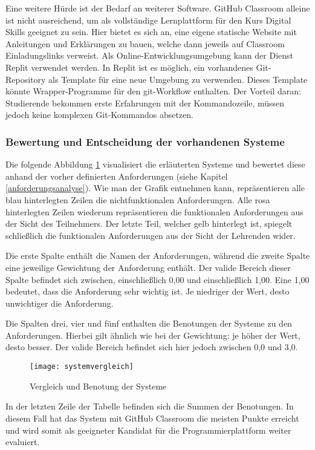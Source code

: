 Eine weitere Hürde ist der Bedarf an weiterer Software. GitHub Classroom alleine
ist nicht ausreichend, um als vollständige Lernplattform für den Kurs Digital
Skills geeignet zu sein. Hier bietet es sich an, eine eigene statische Website
mit Anleitungen und Erklärungen zu bauen, welche dann jeweils auf Classroom
Einladungslinks verweist. Als Online-Entwicklungsumgebung kann der Dienst Replit
verwendet werden. In Replit ist es möglich, ein vorhandenes Git-Repository als
Template für eine neue Umgebung zu verwenden. Dieses Template könnte
Wrapper-Programme für den git-Workflow enthalten. Der Vorteil daran:
Studierende bekommen erste Erfahrungen mit der Kommandozeile, müssen jedoch
keine komplexen Git-Kommandos absetzen.

\subsubsection{Bewertung und Entscheidung der vorhandenen Systeme}
Die folgende Abbildung \ref{fig:systemvergleich} visualisiert die erläuterten
Systeme und bewertet diese anhand der vorher definierten Anforderungen (siehe 
Kapitel \ref{anforderungsanalyse}). Wie man der Grafik entnehmen kann,
repräsentieren alle blau hinterlegten Zeilen die nichtfunktionalen
Anforderungen. Alle rosa hinterlegten Zeilen wiederum repräsentieren die
funktionalen Anforderungen aus der Sicht des Teilnehmers. Der letzte Teil,
welcher gelb hinterlegt ist, spiegelt schließlich die funktionalen Anforderungen
aus der Sicht der Lehrenden wider.

Die erste Spalte enthält die Namen der Anforderungen, während die zweite Spalte
eine jeweilige Gewichtung der Anforderung enthält. Der valide Bereich dieser
Spalte befindet sich zwischen, einschließlich 0,00 und einschließlich 1,00. Eine
1,00 bedeutet, dass die Anforderung sehr wichtig ist. Je niedriger der Wert,
desto unwichtiger die Anforderung.

Die Spalten drei, vier und fünf enthalten die Benotungen der Systeme zu den
Anforderungen. Hierbei gilt ähnlich wie bei der Gewichtung: je höher der Wert,
desto besser. Der valide Bereich befindet sich hier jedoch zwischen 0,0 und 3,0.

\begin{figure}[h]
    \centering
    \texttt{[image: systemvergleich]}
    \caption{Vergleich und Benotung der Systeme}
    \label{fig:systemvergleich}
\end{figure}

In der letzten Zeile der Tabelle befinden sich die Summen der Benotungen. In
diesem Fall hat das System mit GitHub Classroom die meisten Punkte erreicht und
wird somit als geeigneter Kandidat für die Programmierplattform weiter
evaluiert.
